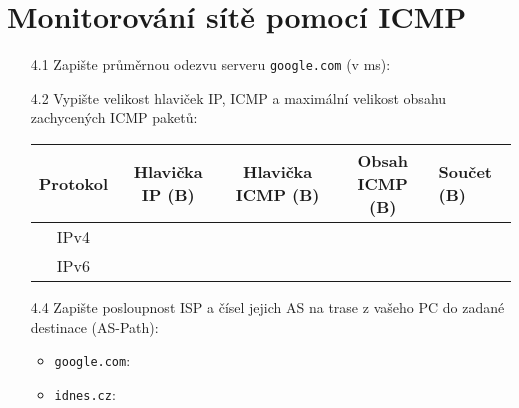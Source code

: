 \documentclass[a4paper,11pt]{article}
\begin{document}
\section{Monitorování sítě pomocí ICMP}
\begin{itemize}
  \item [4.1] Zapište průměrnou odezvu serveru \texttt{google.com} (v ms):
  \item [4.2] Vypište velikost hlaviček IP, ICMP a maximální velikost obsahu zachycených ICMP paketů:

    \vspace{2mm}
    \begin{tabular}{|c|c|c|c|p{3cm}|}  \hline
     Protokol  & Hlavička IP (B)  & Hlavička ICMP (B)  & Obsah ICMP (B) & Součet (B) \\ \hline
     IPv4      &     &       &         &   \\   \hline
     IPv6      &     &       &         &     \\  \hline
\end{tabular}

    \vspace{2mm}
    \item [4.4] Zapište posloupnost ISP a čísel jejich AS na trase z vašeho PC do zadané destinace (AS-Path):
        \begin{itemize}
            \item \texttt{google.com}:
            \vspace{3cm}
            \item \texttt{idnes.cz}:
            \vspace{3cm}
        \end{itemize}
\end{itemize}
\end{document}
